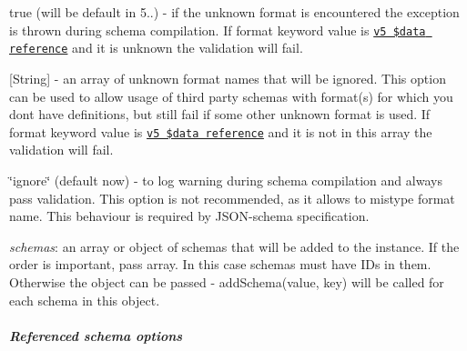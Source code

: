 \begin{DoxyItemize}
\begin{DoxyItemize}
\item {\ttfamily true} (will be default in 5..) -\/ if the unknown format is encountered the exception is thrown during schema compilation. If {\ttfamily format} keyword value is \href{#data-reference}{\tt v5 \$data reference} and it is unknown the validation will fail.
\item {\ttfamily \mbox{[}String\mbox{]}} -\/ an array of unknown format names that will be ignored. This option can be used to allow usage of third party schemas with format(s) for which you don\textquotesingle{}t have definitions, but still fail if some other unknown format is used. If {\ttfamily format} keyword value is \href{#data-reference}{\tt v5 \$data reference} and it is not in this array the validation will fail.
\item {\ttfamily \char`\"{}ignore\char`\"{}} (default now) -\/ to log warning during schema compilation and always pass validation. This option is not recommended, as it allows to mistype format name. This behaviour is required by J\+S\+O\+N-\/schema specification.
\end{DoxyItemize}
\item {\itshape schemas}\+: an array or object of schemas that will be added to the instance. If the order is important, pass array. In this case schemas must have I\+Ds in them. Otherwise the object can be passed -\/ {\ttfamily add\+Schema(value, key)} will be called for each schema in this object.
\end{DoxyItemize}

\subparagraph*{Referenced schema options}


